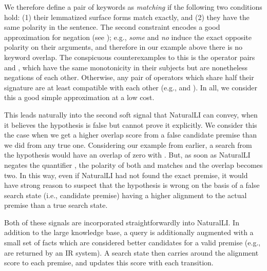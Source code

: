 We therefore define a pair of keywords as \textit{matching} if the following two
  conditions hold: 
  (1) their lemmatized surface forms match exactly, and 
  (2) they have the same polarity in the sentence.
The second constraint encodes a good approximation for negation (see );
  e.g., \textit{some}
  and \textit{no} induce the exact opposite polarity on their arguments,
  and therefore in our example above there is no keyword overlap.
The conspicuous counterexamples to this is the operator pairs  and ,
  which have the same monotonicity in their subjects but are nonetheless negations
  of each other.
Otherwise, any pair of operators which share half their signature are at least
  compatible with each other (e.g.,  and ).
In all, we consider this a good simple approximation at a low cost.

This leads naturally into the second soft signal that NaturalLI can convey, when
  it believes the hypothesis is false but cannot prove it explicitly.
We consider this the case when we get a higher overlap score from a false
  candidate premise than we did from any true one.
Considering our example from earlier, a search from the hypothesis
   would have an overlap of zero with .
But, as soon as NaturalLI negates the quantifier , the polarity of both
   and  matches and the overlap becomes two.
In this way, even if NaturalLI had not found the exact premise, it would have
  strong reason to suspect that the hypothesis is wrong on the basis of a
  false search state (i.e., candidate premise) having a higher alignment to 
  the actual premise than a true search state.

Both of these signals are incorporated straightforwardly into NaturalLI.
In addition to the large knowledge base, a query is additionally augmented
  with a small set of facts which are considered better candidates for
  a valid premise (e.g., are returned by an IR system).
A search state then carries around the alignment score to each premise,
  and updates this score with each transition.
